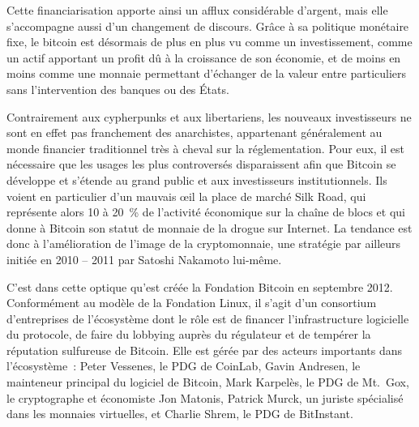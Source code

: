 Cette financiarisation apporte ainsi un afflux considérable d'argent, mais elle s'accompagne aussi d'un changement de discours. Grâce à sa politique monétaire fixe, le bitcoin est désormais de plus en plus vu comme un investissement, comme un actif apportant un profit dû à la croissance de son économie, et de moins en moins comme une monnaie permettant d'échanger de la valeur entre particuliers sans l'intervention des banques ou des États.

Contrairement aux cypherpunks et aux libertariens, les nouveaux investisseurs ne sont en effet pas franchement des anarchistes, appartenant généralement au monde financier traditionnel très à cheval sur la réglementation. Pour eux, il est nécessaire que les usages les plus controversés disparaissent afin que Bitcoin se développe et s'étende au grand public et aux investisseurs institutionnels. Ils voient en particulier d'un mauvais œil la place de marché Silk Road, qui représente alors 10 à 20~\% de l'activité économique sur la chaîne de blocs et qui donne à Bitcoin son statut de monnaie de la drogue sur Internet. La tendance est donc à l'amélioration de l'image de la cryptomonnaie, une stratégie par ailleurs initiée en 2010 -- 2011 par Satoshi Nakamoto lui-même.

C'est dans cette optique qu'est créée la Fondation Bitcoin en septembre 2012. Conformément au modèle de la Fondation Linux, il s'agit d'un consortium d'entreprises de l'écosystème dont le rôle est de financer l'infrastructure logicielle du protocole, de faire du lobbying auprès du régulateur et de tempérer la réputation sulfureuse de Bitcoin. Elle est gérée par des acteurs importants dans l'écosystème~: Peter Vessenes, le PDG de CoinLab, Gavin Andresen, le mainteneur principal du logiciel de Bitcoin, Mark Karpelès, le PDG de Mt.~Gox, le cryptographe et économiste Jon Matonis, Patrick Murck, un juriste spécialisé dans les monnaies virtuelles, et Charlie Shrem, le PDG de BitInstant.

